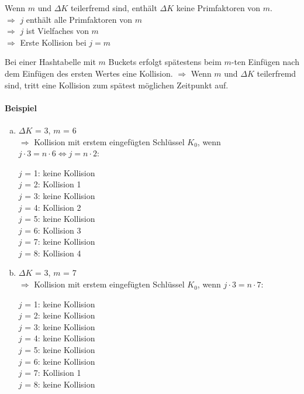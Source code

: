 \begin{solution}
Wenn $m$ und $\Delta K$ teilerfremd sind, enthält $\Delta K$ keine Primfaktoren von $m$. \\ $\Rightarrow$ $j$ enthält alle Primfaktoren von $m$ \\
$\Rightarrow$ $j$ ist Vielfaches von $m$ \\
$\Rightarrow$ Erste Kollision bei $j = m$

Bei einer Hashtabelle mit $m$ Buckets erfolgt spätestens beim $m$-ten Einfügen nach dem Einfügen des ersten Wertes eine Kollision. $\Rightarrow$ Wenn $m$ und $\Delta K$ teilerfremd sind, tritt eine Kollision zum spätest möglichen Zeitpunkt auf.


\paragraph{\color{solutioncolor}Beispiel}

\begin{enumerate}[a)]
	\item $\Delta K$ = 3, $m$ = 6 \\
	$\Rightarrow$ Kollision mit erstem eingefügten Schlüssel $K_0$, wenn $j \cdot 3 = n \cdot 6 \Leftrightarrow j = n \cdot 2$:

	$j$ = 1: keine Kollision \\
	$j$ = 2: Kollision 1 \\
	$j$ = 3: keine Kollision \\
	$j$ = 4: Kollision 2 \\
	$j$ = 5: keine Kollision \\
	$j$ = 6: Kollision 3 \\
	$j$ = 7: keine Kollision \\
	$j$ = 8: Kollision 4 \\

	\item $\Delta K$ = 3, $m$ = 7 \\
	$\Rightarrow$ Kollision mit erstem eingefügten Schlüssel $K_0$, wenn $j \cdot 3 = n  \cdot 7$:

	$j$ = 1: keine Kollision \\
	$j$ = 2: keine Kollision \\
	$j$ = 3: keine Kollision \\
	$j$ = 4: keine Kollision \\
	$j$ = 5: keine Kollision \\
	$j$ = 6: keine Kollision \\
	$j$ = 7: Kollision 1 \\
	$j$ = 8: keine Kollision \\
\end{enumerate}


\end{solution}
